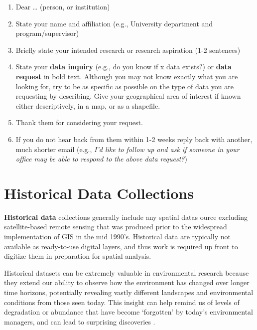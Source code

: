 \documentclass[
]{book}
\providecommand{\tightlist}{%
  \setlength{\itemsep}{0pt}\setlength{\parskip}{0pt}}
\begin{document}
\begin{enumerate}
\def\labelenumi{\arabic{enumi}.}
\tightlist
\item
  Dear \ldots{} (person, or institution)
\item
  State your name and affiliation (e.g., University department and program/supervisor)
\item
  Briefly state your intended research or research aspiration (1-2 sentences)
\item
  State your \textbf{data inquiry} (e.g., do you know if x data exists?) or \textbf{data request} in bold text. Although you may not know exactly what you are looking for, try to be as specific as possible on the type of data you are requesting by describing. Give your geographical area of interest if known either descriptively, in a map, or as a shapefile.
\item
  Thank them for considering your request.
\item
  If you do not hear back from them within 1-2 weeks reply back with another, much shorter email (e.g., \emph{I'd like to follow up and ask if someone in your office may be able to respond to the above data request?})
\end{enumerate}

\hypertarget{historical-data-collections}{%
\section{Historical Data Collections}\label{historical-data-collections}}

\textbf{Historical data} collections generally include any spatial datas ource excluding satellite-based remote sensing that was produced prior to the widespread implementation of GIS in the mid 1990's. Historical data are typically not available as ready-to-use digital layers, and thus work is required up front to digitize them in preparation for spatial analysis.

Historical datasets can be extremely valuable in environmental research because they extend our ability to observe how the environment has changed over longer time horizons, potentially revealing vastly different landscapes and environmental conditions from those seen today. This insight can help remind us of levels of degradation or abundance that have become `forgotten' by today's environmental managers, and can lead to surprising discoveries \citep{mcclenachan_importance_2015}.
\end{document}
